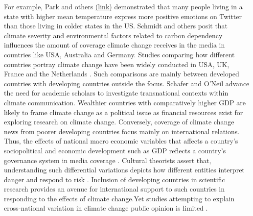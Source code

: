 \documentclass{article}
\begin{document}
For example, Park and others \cite{park_mood_2013} \href{https://pdfs.semanticscholar.org/b282/feb759e57530b115dcc4bb080f96598a5246.pdf}{(link)} demonstrated that many people living in a state with higher mean temperature express more positive emotions on Twitter than those living in colder states in the US. Schmidt and others \cite{schmidt_media_2013} posit that climate severity and environmental factors related to carbon dependency influences the amount of coverage climate change receives in the media in countries like USA, Australia and Germany. Studies comparing how different countries portray climate change have been widely conducted in USA, UK, France and the Netherlands \cite{vu_nationalizing_2019}. Such comparisons are mainly between developed countries with developing countries outside the focus.  Schafer and O’Neil \cite{schafer_what_2013} advance the need for academic scholars to investigate transnational contexts within climate communication. Wealthier countries with comparatively higher GDP are likely to frame climate change as a political issue as financial resources exist for exploring research on climate change. Conversely, coverage of climate change news from poorer developing countries focus mainly on international relations. Thus, the effects of national macro economic variables that affects a country’s sociopolitical and economic development such as GDP reflects a country’s governance system in media coverage \cite{vu_what_2018}. Cultural theorists assert that, understanding such differential variations depicts how different entities interpret danger and respond to risk \cite{tansey_cultural_1999}. Inclusion of developing countries in scientific research provides an avenue for international support to such countries in responding to the effects of climate change.Yet studies attempting to explain cross-national variation in climate change public opinion is limited \cite{knight_public_2016}.
\end{document}
